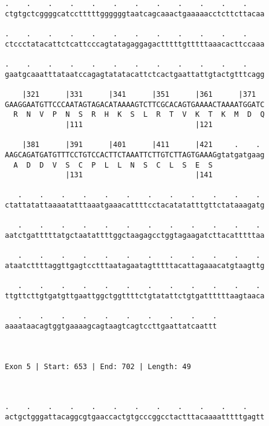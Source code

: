 \documentclass{article}
\begin{document}
\begin{Verbatim}
.    .    .    .    .    .    .    .    .    .    .    .    
ctgtgctcggggcatcctttttggggggtaatcagcaaactgaaaaacctcttcttacaa
                                                            
.    .    .    .    .    .    .    .    .    .    .    .    
ctccctatacattctcattcccagtatagaggagactttttgtttttaaacacttccaaa
                                                            
.    .    .    .    .    .    .    .    .    .    .    .    
gaatgcaaatttataatccagagtatatacattctcactgaattattgtactgtttcagg
                                                            
    |321      |331      |341      |351      |361      |371  
GAAGGAATGTTCCCAATAGTAGACATAAAAGTCTTCGCACAGTGAAAACTAAAATGGATC
  R  N  V  P  N  S  R  H  K  S  L  R  T  V  K  T  K  M  D  Q
              |111                          |121            
  
    |381      |391      |401      |411      |421     .    . 
AAGCAGATGATGTTTCCTGTCCACTTCTAAATTCTTGTCTTAGTGAAAGgtatgatgaag
  A  D  D  V  S  C  P  L  L  N  S  C  L  S  E  S            
              |131                          |141            
  
   .    .    .    .    .    .    .    .    .    .    .    . 
ctattatattaaaatatttaaatgaaacattttcctacatatatttgttctataaagatg
                                                            
   .    .    .    .    .    .    .    .    .    .    .    . 
aatctgatttttatgctaatattttggctaagagcctggtagaagatcttacatttttaa
                                                            
   .    .    .    .    .    .    .    .    .    .    .    . 
ataatcttttaggttgagtcctttaatagaatagtttttacattagaaacatgtaagttg
                                                            
   .    .    .    .    .    .    .    .    .    .    .    . 
ttgttcttgtgatgttgaattggctggttttctgtatattctgtgattttttaagtaaca
                                                            
   .    .    .    .    .    .    .    .    .    .
aaaataacagtggtgaaaagcagtaagtcagtccttgaattatcaattt
                                                 
                                                 
 
Exon 5 | Start: 653 | End: 702 | Length: 49



.    .    .    .    .    .    .    .    .    .    .    .    
actgctgggattacaggcgtgaaccactgtgcccggcctactttacaaaatttttgagtt
                                                            

\end{Verbatim}
\end{document}
